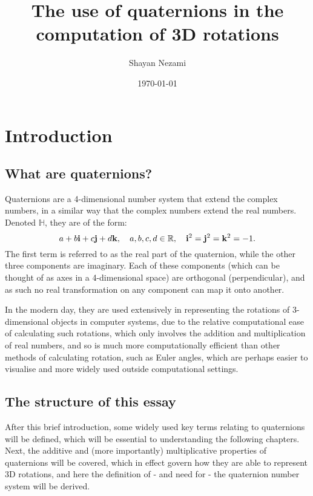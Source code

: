 \documentclass[10pt]{article}
\title{The use of quaternions in the computation of 3D rotations}
\author{Shayan Nezami}
\date{\today}
\begin{document}
\maketitle
\vspace{10pt}
\tableofcontents
\pagebreak

\section{Introduction}

\subsection{What are quaternions?}

Quaternions are a 4-dimensional number system that extend the complex numbers, in a similar way that the complex numbers extend the real numbers. Denoted $\mathbb{H}$, they are of the form:
\begin{equation}
    a + b\vb{i} + c\vb{j} + d\vb{k}, \quad a, b, c, d \in \mathbb{R}, \quad \vb{i}^2=\vb{j}^2=\vb{k}^2=-1.
\end{equation}
The first term is referred to as the real part of the quaternion, while the other three components are imaginary. Each of these components (which can be thought of as axes in a 4-dimensional space) are orthogonal (perpendicular), and as such no real transformation on any component can map it onto another.

In the modern day, they are used extensively in representing the rotations of 3-dimensional objects in computer systems, due to the relative computational ease of calculating such rotations, which only involves the addition and multiplication of real numbers, and so is much more computationally efficient than other methods of calculating rotation, such as Euler angles, which are perhaps easier to visualise and more widely used outside computational settings. \cite{QuaternionWiki}

\subsection{The structure of this essay}

After this brief introduction, some widely used key terms relating to quaternions will be defined, which will be essential to understanding the following chapters. Next, the additive and (more importantly) multiplicative properties of quaternions will be covered, which in effect govern how they are able to represent 3D rotations, and here the definition of - and need for - the quaternion number system will be derived.
\end{document}
